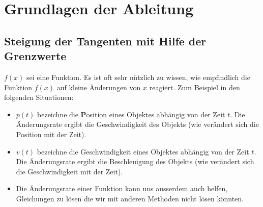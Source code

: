 \chapter{Grundlagen der Ableitung}


\section{Steigung der Tangenten mit Hilfe der Grenzwerte}

$f(x)$ sei eine Funktion. Es ist oft sehr nützlich zu wissen, wie empfindlich die Funktion $f(x)$ auf kleine Änderungen von $x$ reagiert. Zum Beispiel in den folgenden Situationen:

\begin{itemize}
\item $p(t)$ bezeichne die \textbf{P}osition eines Objektes abhängig von der Zeit $t$. Die Änderungsrate ergibt die Geschwindigkeit des Objekts (wie verändert sich die Position mit der Zeit).
\item $v(t)$ bezeichne die Geschwindigkeit eines Objektes abhängig von der Zeit $t$. Die Änderungsrate ergibt die Beschleuigung des Objekts (wie verändert sich die Geschwindigkeit mit der Zeit).
\item Die Änderungsrate einer Funktion kann uns ausserdem auch helfen, Gleichungen zu lösen die wir mit anderen Methoden nicht lösen könnten.
\end{itemize}

